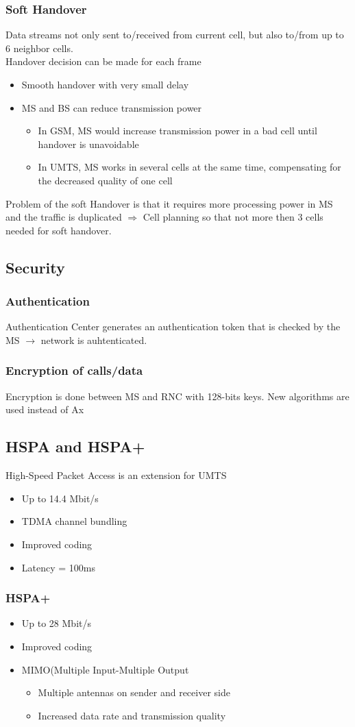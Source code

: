 \subsubsection{Soft Handover}
Data streams not only sent to/received from current cell, but also to/from 
up to 6 neighbor cells.\\
Handover decision can be made for each frame
\begin{itemize}
	\item Smooth handover with very small delay
	\item MS and BS can reduce transmission power
	\begin{itemize}
		\item In GSM, MS would increase transmission power in a bad cell
		until handover is unavoidable
		\item In UMTS, MS works in several cells at the same time, 
		compensating for the decreased quality of one cell
	\end{itemize}
\end{itemize}
Problem of the soft Handover is that it requires more processing power in MS and
the traffic is duplicated $\Rightarrow$ Cell planning so that not more then
3 cells needed for soft handover.

\subsection{Security}
\subsubsection{Authentication}
Authentication Center generates an authentication token that is checked by the 
MS $\to$ network is auhtenticated.
\subsubsection{Encryption of calls/data}
Encryption is done between MS and RNC with 128-bits keys. New algorithms are
used instead of Ax

\subsection{HSPA and HSPA+}
High-Speed Packet Access is an extension for UMTS
\begin{itemize}
	\item Up to 14.4 Mbit/s
	\item TDMA channel bundling
	\item Improved coding
	\item Latency = 100ms
\end{itemize}
\subsubsection{HSPA+}
\begin{itemize}
	\item Up to 28 Mbit/s
	\item Improved coding
	\item MIMO(Multiple Input-Multiple Output
	\begin{itemize}
		\item Multiple antennas on sender and receiver side
		\item Increased data rate and transmission quality
	\end{itemize}
\end{itemize}

